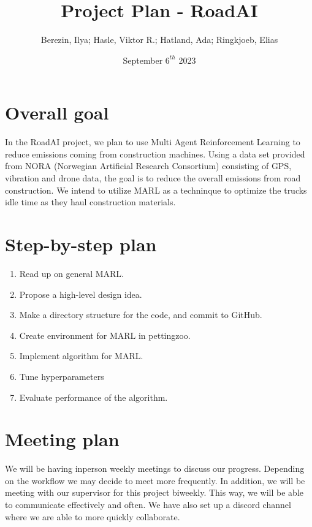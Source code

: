 \documentclass{article}
\title{Project Plan - RoadAI}
\author{Berezin, Ilya; Hasle, Viktor R.; Hatland, Ada; Ringkjoeb, Elias}
\date{September $6^{th}$ 2023}
\begin{document}
\maketitle

\section{Overall goal}
In the RoadAI project, we plan to use Multi Agent Reinforcement Learning to reduce emissions coming from
construction machines. Using a data set provided from NORA (Norwegian Artificial Research Consortium) consisting of GPS, vibration and drone data, the goal is to reduce the overall emissions from road construction. We intend to utilize MARL as a techninque to optimize
the trucks idle time as they haul construction materials.

\section{Step-by-step plan}
\begin{enumerate}
  \item Read up on general MARL.
  \item Propose a high-level design idea.
  \item Make a directory structure for the code, and commit to GitHub.
  \item Create environment for MARL in pettingzoo.
  \item Implement algorithm for MARL. 
  \item Tune hyperparameters
  \item Evaluate performance of the algorithm.
\end{enumerate}

\section{Meeting plan}
We will be having inperson weekly meetings to discuss our progress. Depending on the workflow we may decide to 
meet more frequently. In addition, we will be meeting with our supervisor for this project biweekly. This way,
we will be able to communicate effectively and often. We have also set up a discord channel where we are able to more quickly collaborate.
\end{document}
